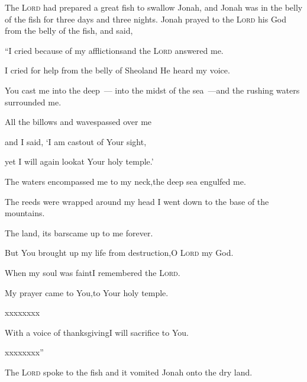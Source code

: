 
\begin{inparaenum}
  The \textsc{Lord} had prepared%
  a great fish%
  to swallow Jonah, and Jonah was in the belly of the fish for three days and three nights.%
   Jonah prayed to the \textsc{Lord} his God from the belly of the fish,%
   and said,\smallskip%
  
  \pd ``I cried because of my afflictions\pa and the \textsc{Lord} answered me.%
  
  \pd I cried for help from the belly of Sheol\pa and He heard my voice.%
  
  \pc {} You cast me into the deep~--- into the midst of the sea~---\pa and the rushing%
  waters surrounded me.%
  
  \pd All the billows and waves\pa passed over me%
  
  \pc {} and I said, `I am cast\pa out of Your sight,%
  
  \pd yet I will again look\pa at Your holy temple.'%
  
  \pc {} The waters encompassed me to my neck,\pa the deep sea engulfed me.%
  
  \pd The reeds%
  were wrapped around my head\pa {} I went down to the base of the mountains.%
  
  \pd The land, its bars\pa came up to me forever.%
  
  \pd But You brought up my life from destruction,\pa O \textsc{Lord} my God.%
  
  \pc {} When my soul was faint\pa I remembered the \textsc{Lord}.%
  
  \pd My prayer came to You,\pa to Your holy temple.%
  
  \pc {} xxxx\pa xxxx%
  
  \pc {} With a voice of thanksgiving\pa I will sacrifice to You.%
  
  \pd xxxx\pa xxxx''\smallskip%
  
   The \textsc{Lord} spoke to the fish and it vomited Jonah onto the dry land.%
\end{inparaenum}
